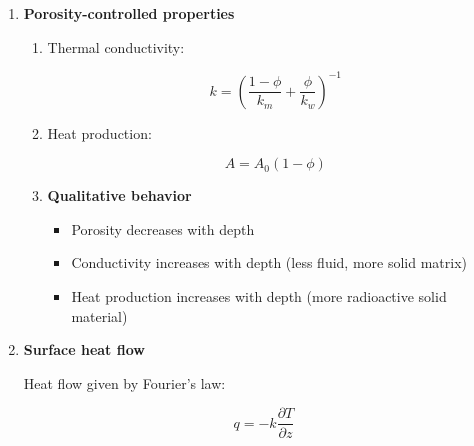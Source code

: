 \documentclass[final,a4paper,12pt]{article}
\newcommand{\half}{\tfrac{1}{2}}
\begin{document}
\begin{enumerate}
Conductivities at interfaces:

\begin{align}
k_{i+\half,j} &= \frac{1}{2}\left(
k_{i+\half,j-\half} + k_{i+\half,j+\half}
\right) \\
k_{i-\half,j} &= \frac{1}{2}\left(
k_{i-\half,j-\half} + k_{i-\half,j+\half}
\right) \\
k_{i,j+\half} &= \frac{1}{2}\left(
k_{i-\half,j+\half} + k_{i+\half,j+\half}
\right) \\
k_{i,j-\half} &= \frac{1}{2}\left(
k_{i-\half,j-\half} + k_{i+\half,j-\half}
\right)
\end{align}

\item \textbf{Porosity-controlled properties}

\begin{enumerate}

\item Thermal conductivity:

\begin{equation}
k = \left( \frac{1-\phi}{k_m} + \frac{\phi}{k_w} \right)^{-1}
\end{equation}

\item Heat production:

\begin{equation}
A = A_0 (1 - \phi)
\end{equation}

\item \textbf{Qualitative behavior}

\begin{itemize}
\item Porosity decreases with depth
\item Conductivity increases with depth (less fluid, more solid matrix)
\item Heat production increases with depth (more radioactive solid material)
\end{itemize}

\end{enumerate}

\item \textbf{Surface heat flow}

Heat flow given by Fourier's law:

\begin{equation}
q = -k \frac{\partial T}{\partial z}
\end{equation}


\end{enumerate}
\end{document}
